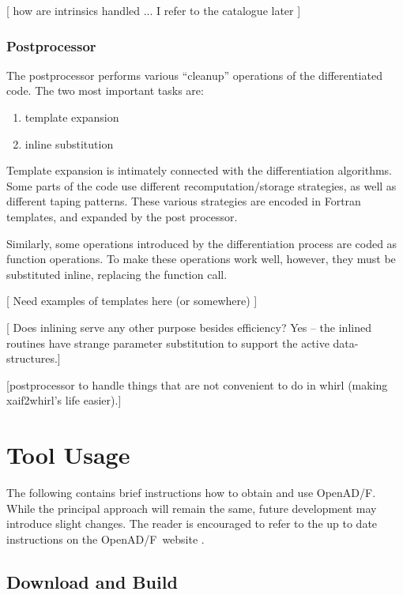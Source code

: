 \documentclass[11pt]{article}
\newcommand{\OpenADF}{OpenAD/F}
\begin{document}
{\color{red} [ how are intrinsics handled ... I refer to the catalogue later  ] }



\subsubsection{Postprocessor}\label{sssec:PostProcessor}
The postprocessor performs various ``cleanup'' operations of the
differentiated code. The two most important tasks are:
\begin{enumerate}
\item template expansion
\item inline substitution
\end{enumerate}

Template expansion is intimately connected with the differentiation
algorithms. Some parts of the code use different recomputation/storage
strategies, as well as different taping patterns. These various
strategies are encoded in Fortran templates, and expanded by the
post processor.

Similarly, some operations introduced by the differentiation process
are coded as function operations. To make these operations work well,
however, they must be substituted inline, replacing the function call.

{\color{red}
  [ Need examples of templates here (or somewhere) ]

  [ Does inlining serve any other purpose besides efficiency?  Yes --
  the inlined routines have strange parameter substitution to support
  the active data-structures.]

  [postprocessor to handle things that are not convenient to do in whirl
  (making xaif2whirl's life easier).]
}



\section{Tool Usage} \label{sec:Usage}
The following contains brief instructions how to obtain and use \OpenADF. 
While the principal approach will remain the same, future development may 
introduce slight changes. The reader is encouraged to refer to the 
up to date instructions on the \OpenADF\ website \cite{openadWeb}.
\subsection{Download and Build}\label{ssec:dab}
\end{document}
